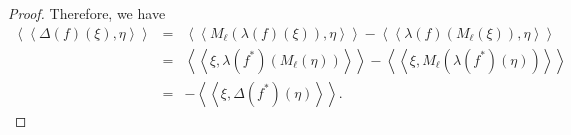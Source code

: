\documentclass[10pt,a4paper]{amsart}
\newcommand{\Bea}{\begin{eqnarray*}}
\newcommand{\Eea}{\end{eqnarray*}}
\begin{document}
\begin{proof}
				
				
				
Therefore, we have 
\Bea
	\left \langle \left \langle \Delta (f) (\xi), \eta \right \rangle \right \rangle & = &  \left \langle \left \langle M_{\ell} (\lambda (f) (\xi)), \eta \right \rangle \right \rangle - \left \langle \left \langle \lambda (f) (M_{\ell} (\xi)), \eta \right \rangle \right \rangle \\ & = &  \left \langle \left \langle \xi, \lambda (f^{\ast}) \left (M_{\ell} (\eta) \right ) \right \rangle \right \rangle - \left \langle \left \langle \xi, M_{\ell} \left (\lambda (f^{\ast}) (\eta) \right ) \right \rangle \right \rangle \\ & = &  - \left \langle \left \langle \xi, \Delta (f^{\ast}) (\eta) \right \rangle \right \rangle.  
\Eea
				

\end{proof}
\end{document}
